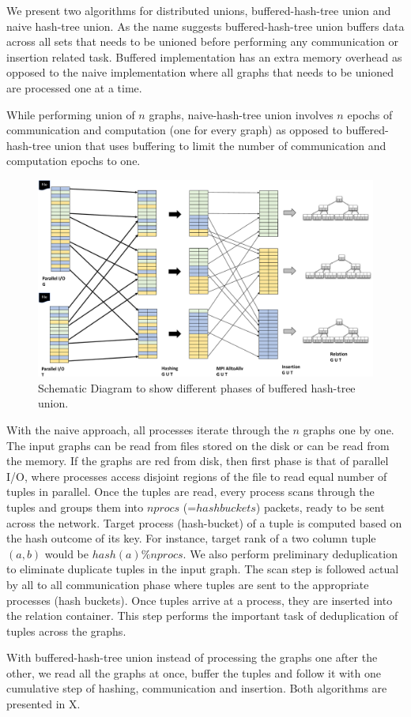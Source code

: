 We present two algorithms for distributed unions, buffered-hash-tree union and naive hash-tree union. As the name suggests buffered-hash-tree union buffers data across all sets that needs to be unioned before performing any communication or insertion related task. Buffered implementation has an extra memory overhead as opposed to the naive implementation where all graphs that needs to be unioned are processed one at a time.

While performing union of $n$ graphs, naive-hash-tree union involves $n$ epochs of communication and computation (one for every graph) as opposed to buffered-hash-tree union that uses buffering to limit the number of communication and computation epochs to one. 

\begin{figure}[h]
	\includegraphics[width=\columnwidth]{results/union_2.pdf}
	\caption{Schematic Diagram to show different phases of buffered hash-tree union.}
	\label{fig:union_2}
\end{figure}

With the naive approach, all processes iterate through the $n$ graphs one by one.
The input graphs can be read from files stored on the disk or can be read from the memory. If the graphs are red from disk, then first phase is that of parallel I/O, where processes access disjoint regions of the file to read equal number of tuples in parallel. Once the tuples are read, every process scans through the tuples and groups them into $nprocs$ (=$hashbuckets$) packets, ready to be sent across the network.
Target process (hash-bucket) of a tuple is computed based on the hash outcome of its key. For instance, target rank of a two column tuple $(a, b)$ would be $hash(a)\%nprocs$. We also perform preliminary deduplication to eliminate duplicate tuples in the input graph. The scan step is followed actual by all to all communication phase where tuples are sent to the appropriate processes (hash buckets). Once tuples arrive at a process, they are inserted into the relation container. This step performs the important task of deduplication of tuples across the graphs. 

With buffered-hash-tree union instead of processing the graphs one after the other, we read all the graphs at once, buffer the tuples and follow it with one cumulative step of hashing, communication and insertion. Both algorithms are presented in X.